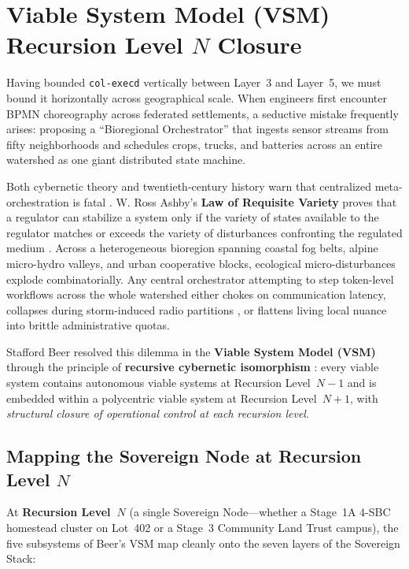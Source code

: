 \section{Viable System Model (VSM) Recursion Level $N$ Closure}
\label{sec:ch1-vsm-closure}

Having bounded \texttt{col-execd} vertically between Layer~3 and Layer~5, we must bound it
horizontally across geographical scale. When engineers first encounter BPMN choreography
across federated settlements, a seductive mistake frequently arises: proposing a
``Bioregional Orchestrator'' that ingests sensor streams from fifty neighborhoods and
schedules crops, trucks, and batteries across an entire watershed as one giant distributed
state machine.

Both cybernetic theory and twentieth-century history warn that centralized
meta-orchestration is fatal \parencite{scott1998,beer1972}. W. Ross Ashby's \textbf{Law of
Requisite Variety} proves that a regulator can stabilize a system only if the variety of
states available to the regulator matches or exceeds the variety of disturbances confronting
the regulated medium \parencite{ashby1956}. Across a heterogeneous bioregion spanning
coastal fog belts, alpine micro-hydro valleys, and urban cooperative blocks, ecological
micro-disturbances explode combinatorially. Any central orchestrator attempting to step
token-level workflows across the whole watershed either chokes on communication latency,
collapses during storm-induced radio partitions \parencite{fall2003}, or flattens living
local nuance into brittle administrative quotas.

Stafford Beer resolved this dilemma in the \textbf{Viable System Model (VSM)} through the
principle of \textbf{recursive cybernetic isomorphism} \parencite{beer1972,beer1979}: every
viable system contains autonomous viable systems at Recursion Level~$N-1$ and is embedded
within a polycentric viable system at Recursion Level~$N+1$, with \textit{structural closure
of operational control at each recursion level}.

\subsection{Mapping the Sovereign Node at Recursion Level $N$}

At \textbf{Recursion Level~$N$} (a single Sovereign Node---whether a Stage~1A 4-SBC
homestead cluster on Lot~402 or a Stage~3 Community Land Trust campus), the five subsystems
of Beer's VSM map cleanly onto the seven layers of the Sovereign Stack:

